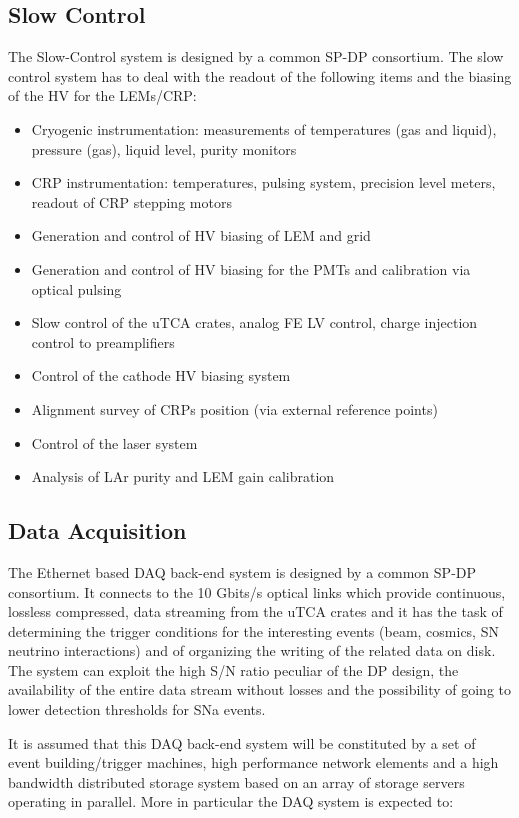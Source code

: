 \subsection{Slow Control}
\label{v4:fddp-ov:sc}
The Slow-Control system is designed by a common SP-DP consortium. The slow control system has to deal with the readout of the following items
and the biasing of the HV for the LEMs/CRP:

\begin{itemize}
\item Cryogenic instrumentation: measurements of temperatures (gas and liquid), pressure (gas), liquid level, purity monitors
\item CRP instrumentation: temperatures, pulsing system, precision level meters, readout of CRP stepping motors
\item Generation and control of HV biasing of LEM and grid
\item Generation and control of HV biasing for the PMTs and calibration via optical pulsing
\item Slow control of the uTCA crates, analog FE LV control, charge injection control to preamplifiers
\item Control of the cathode HV biasing system
\item Alignment survey of CRPs position (via external reference points)
\item Control of the laser system
\item Analysis of LAr purity and LEM  gain calibration
\end{itemize}


\subsection{Data Acquisition}
\label{v4:fddp-ov:daq}

The Ethernet based DAQ back-end system is designed by a common SP-DP consortium. It connects to the 10 Gbits/s optical links which provide continuous, lossless compressed, data streaming from the uTCA crates and it has the task of determining the trigger conditions for the interesting events (beam, cosmics, SN neutrino interactions) and of organizing the writing of the related data on disk. The system can exploit the high S/N ratio peculiar of the DP design, the availability of the entire data stream without losses and the possibility of going to lower detection thresholds for SNa events.

 It  is assumed that this DAQ back-end system will be constituted by a set of event building/trigger machines, high performance network elements and a high bandwidth distributed storage system based on an array of storage servers operating in parallel. More in particular the DAQ system is expected to:

